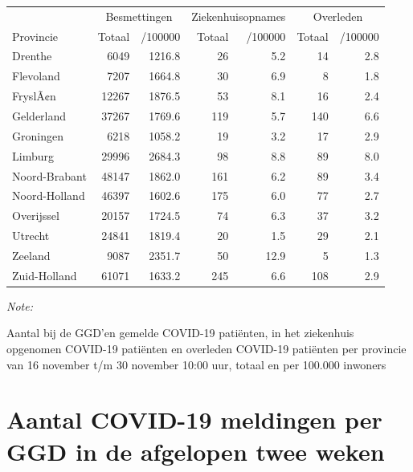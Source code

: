 \documentclass[
  english,
  man,floatsintext]{apa6}
\begin{document}
\begin{table}
\centering
\begin{threeparttable}
\begin{tabular}{lrrrrrr}
\toprule
\multicolumn{1}{c}{ } & \multicolumn{2}{c}{Besmettingen} & \multicolumn{2}{c}{Ziekenhuisopnames} & \multicolumn{2}{c}{Overleden} \\
\cmidrule(l{3pt}r{3pt}){2-3} \cmidrule(l{3pt}r{3pt}){4-5} \cmidrule(l{3pt}r{3pt}){6-7}
Provincie & Totaal & /100000 & Totaal & /100000 & Totaal & /100000\\
\midrule
Drenthe & 6049 & 1216.8 & 26 & 5.2 & 14 & 2.8\\
Flevoland & 7207 & 1664.8 & 30 & 6.9 & 8 & 1.8\\
FryslÃ¢n & 12267 & 1876.5 & 53 & 8.1 & 16 & 2.4\\
Gelderland & 37267 & 1769.6 & 119 & 5.7 & 140 & 6.6\\
Groningen & 6218 & 1058.2 & 19 & 3.2 & 17 & 2.9\\
Limburg & 29996 & 2684.3 & 98 & 8.8 & 89 & 8.0\\
Noord-Brabant & 48147 & 1862.0 & 161 & 6.2 & 89 & 3.4\\
Noord-Holland & 46397 & 1602.6 & 175 & 6.0 & 77 & 2.7\\
Overijssel & 20157 & 1724.5 & 74 & 6.3 & 37 & 3.2\\
Utrecht & 24841 & 1819.4 & 20 & 1.5 & 29 & 2.1\\
Zeeland & 9087 & 2351.7 & 50 & 12.9 & 5 & 1.3\\
Zuid-Holland & 61071 & 1633.2 & 245 & 6.6 & 108 & 2.9\\
\bottomrule
\end{tabular}
\begin{tablenotes}
\item \textit{Note: } 
\item Aantal bij de GGD’en gemelde COVID-19 patiënten, in het ziekenhuis opgenomen COVID-19 patiënten en overleden COVID-19 patiënten per provincie van 16 november t/m 30 november 10:00 uur, totaal en per 100.000 inwoners
\end{tablenotes}
\end{threeparttable}
\end{table}

\newpage

\hypertarget{aantal-covid-19-meldingen-per-ggd-in-de-afgelopen-twee-weken}{%
\section{Aantal COVID-19 meldingen per GGD in de afgelopen twee weken}\label{aantal-covid-19-meldingen-per-ggd-in-de-afgelopen-twee-weken}}
\end{document}
